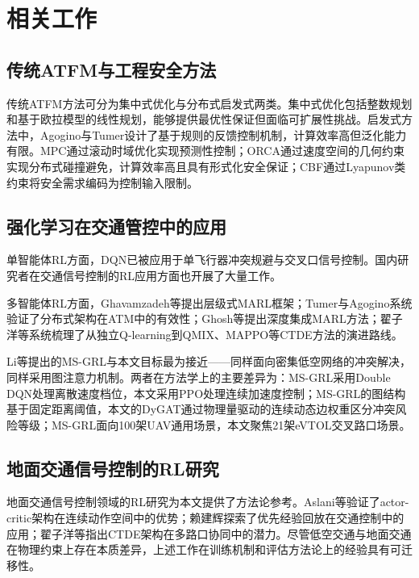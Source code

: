 \documentclass[12pt,a4paper,UTF8]{ctexart}
\begin{document}
\section{相关工作}

\subsection{传统ATFM与工程安全方法}

传统ATFM方法可分为集中式优化与分布式启发式两类。集中式优化包括整数规划和基于欧拉模型的线性规划\cite{ref2}，能够提供最优性保证但面临可扩展性挑战。启发式方法中，Agogino与Tumer\cite{ref14}设计了基于规则的反馈控制机制，计算效率高但泛化能力有限。MPC\cite{ref3}通过滚动时域优化实现预测性控制；ORCA\cite{ref4}通过速度空间的几何约束实现分布式碰撞避免，计算效率高且具有形式化安全保证；CBF\cite{ref5}通过Lyapunov类约束将安全需求编码为控制输入限制。

\subsection{强化学习在交通管控中的应用}

单智能体RL方面，DQN已被应用于单飞行器冲突规避与交叉口信号控制\cite{ref11}。国内研究者在交通信号控制的RL应用方面也开展了大量工作\cite{ref15,ref16,ref17,ref18,ref19,ref20,ref21,ref22}。

多智能体RL方面，Ghavamzadeh等\cite{ref23}提出层级式MARL框架；Tumer与Agogino\cite{ref7,ref14,ref24}系统验证了分布式架构在ATM中的有效性；Ghosh等\cite{ref9}提出深度集成MARL方法；翟子洋等\cite{ref12}系统梳理了从独立Q-learning到QMIX、MAPPO等CTDE方法的演进路线。

Li等\cite{ref10}提出的MS-GRL与本文目标最为接近——同样面向密集低空网络的冲突解决，同样采用图注意力机制。两者在方法学上的主要差异为：MS-GRL采用Double DQN处理离散速度档位，本文采用PPO处理连续加速度控制；MS-GRL的图结构基于固定距离阈值，本文的DyGAT通过物理量驱动的连续动态边权重区分冲突风险等级；MS-GRL面向100架UAV通用场景，本文聚焦21架eVTOL交叉路口场景。

\subsection{地面交通信号控制的RL研究}

地面交通信号控制领域的RL研究为本文提供了方法论参考。Aslani等\cite{ref11}验证了actor-critic架构在连续动作空间中的优势；赖建辉\cite{ref17}探索了优先经验回放在交通控制中的应用；翟子洋等\cite{ref12}指出CTDE架构在多路口协同中的潜力。尽管低空交通与地面交通在物理约束上存在本质差异，上述工作在训练机制和评估方法论上的经验具有可迁移性。
\end{document}
